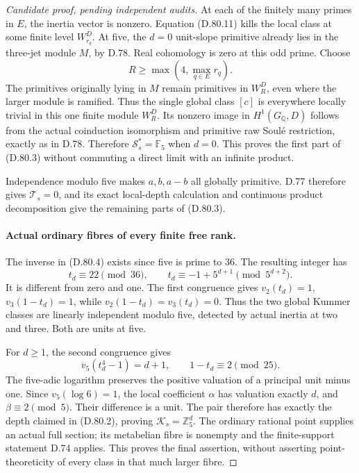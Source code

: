 \begin{proof}[Candidate proof, pending independent audits]
At each of the finitely many primes in \(E\), the inertia
vector is nonzero. Equation (D.80.11) kills the local
class at some finite level \(W_{r_q}^D\). At five,
the \(d=0\) unit-slope primitive already lies in the
three-jet module \(M\), by D.78. Real cohomology is
zero at this odd prime. Choose
\[
                         R\ge\max(4,\max_{q\in E}r_q).
                                                               \tag{D.80.15}
\]
The primitives originally lying in \(M\) remain primitives
in \(W_R^D\), even where the larger module is ramified.
Thus the single global class \([c]\) is everywhere locally
trivial in this one finite module \(W_R^D\). Its nonzero
image in \(H^1(G_{\mathbb Q},D)\) follows from the actual
coinduction isomorphism and primitive raw Soul\'e restriction,
exactly as in D.78. Therefore \(\mathcal S_s^*=\mathbb F_5\)
when \(d=0\). This proves the first part of (D.80.3)
without commuting a direct limit with an infinite product.

Independence modulo five makes \(a,b,a-b\) all globally
primitive. D.77 therefore gives \(\mathcal T_s=0\), and
its exact local-depth calculation and continuous product
decomposition give the remaining parts of (D.80.3).

\paragraph{Actual ordinary fibres of every finite free rank.}
The inverse in (D.80.4) exists since five is prime to \(36\).
The resulting integer has
\[
 t_d\equiv22\pmod{36},\qquad
 t_d\equiv-1+5^{d+1}\pmod{5^{d+2}}.                    \tag{D.80.16}
\]
It is different from zero and one. The first congruence
gives \(v_2(t_d)=1\), \(v_3(1-t_d)=1\), while
\(v_2(1-t_d)=v_3(t_d)=0\). Thus the two global Kummer
classes are linearly independent modulo five, detected
by actual inertia at two and three. Both are units at five.

For \(d\ge1\), the second congruence gives
\[
 v_5(t_d^4-1)=d+1,\qquad 1-t_d\equiv2\pmod{25}.
\]
The five-adic logarithm preserves the positive valuation
of a principal unit minus one. Since \(v_5(\log6)=1\),
the local coefficient \(\alpha\) has valuation exactly
\(d\), and \(\beta\equiv2\pmod5\). Their difference
is a unit. The pair therefore has exactly the depth
claimed in (D.80.2), proving \(\mathcal K_s=\mathbb Z_5^d\).
The ordinary rational point supplies an actual full
section; its metabelian fibre is nonempty and the
finite-support statement D.74 applies. This proves
the final assertion, without asserting point-theoreticity
of every class in that much larger fibre.
\end{proof}
